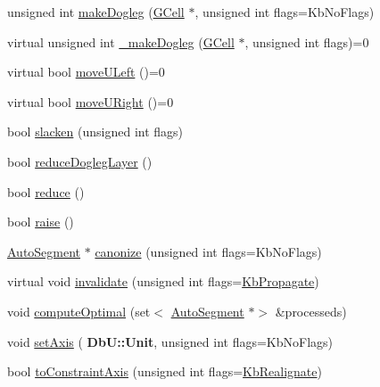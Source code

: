 \begin{DoxyCompactItemize}
\item 
unsigned int \hyperlink{classKatabatic_1_1AutoSegment_aa21b16647c1750ba8b3eb9d99b12f073}{make\+Dogleg} (\hyperlink{classKatabatic_1_1GCell}{G\+Cell} $\ast$, unsigned int flags=Kb\+No\+Flags)
\item 
virtual unsigned int \hyperlink{classKatabatic_1_1AutoSegment_a37a14b40295ccb50cd5001891385807b}{\+\_\+make\+Dogleg} (\hyperlink{classKatabatic_1_1GCell}{G\+Cell} $\ast$, unsigned int flags)=0
\item 
virtual bool \hyperlink{classKatabatic_1_1AutoSegment_af8ca7b17e952f4b599aeeb2f4e5be395}{move\+U\+Left} ()=0
\item 
virtual bool \hyperlink{classKatabatic_1_1AutoSegment_ad7fd54ca229fcf5ccd99f87b019b9cbc}{move\+U\+Right} ()=0
\item 
bool \hyperlink{classKatabatic_1_1AutoSegment_a1fbc0adb4c0b14632edc7c55f028cd4b}{slacken} (unsigned int flags)
\item 
bool \hyperlink{classKatabatic_1_1AutoSegment_acecc9a1d55a271a4b1587d7872cfe133}{reduce\+Dogleg\+Layer} ()
\item 
bool \hyperlink{classKatabatic_1_1AutoSegment_a27a6a2c747ff93d209878a32d97e9157}{reduce} ()
\item 
bool \hyperlink{classKatabatic_1_1AutoSegment_ace393c3c082a5e62a348168354660e39}{raise} ()
\item 
\hyperlink{classKatabatic_1_1AutoSegment}{Auto\+Segment} $\ast$ \hyperlink{classKatabatic_1_1AutoSegment_a8b0d5044dce091d06b633848a6f8a66d}{canonize} (unsigned int flags=Kb\+No\+Flags)
\item 
virtual void \hyperlink{classKatabatic_1_1AutoSegment_a23599eee5a07af377fbc8d47cda7e7b0}{invalidate} (unsigned int flags=\hyperlink{namespaceKatabatic_a2af2ad6b6441614038caf59d04b3b217a3f95c1f06fe0b58b44ccbc57d99f2a5d}{Kb\+Propagate})
\item 
void \hyperlink{classKatabatic_1_1AutoSegment_aa902247a1e967e52cc3ab087cd52b366}{compute\+Optimal} (set$<$ \hyperlink{classKatabatic_1_1AutoSegment}{Auto\+Segment} $\ast$$>$ \&processeds)
\item 
void \hyperlink{classKatabatic_1_1AutoSegment_a3881efebb7510d9b22e5f89bcd418954}{set\+Axis} (\textbf{ Db\+U\+::\+Unit}, unsigned int flags=Kb\+No\+Flags)
\item 
bool \hyperlink{classKatabatic_1_1AutoSegment_a8ab41a962e18810808f4f065863b5a73}{to\+Constraint\+Axis} (unsigned int flags=\hyperlink{namespaceKatabatic_a2af2ad6b6441614038caf59d04b3b217a45a219697151531a23e997b11118e08a}{Kb\+Realignate})
$$
\end{DoxyCompactItemize}
